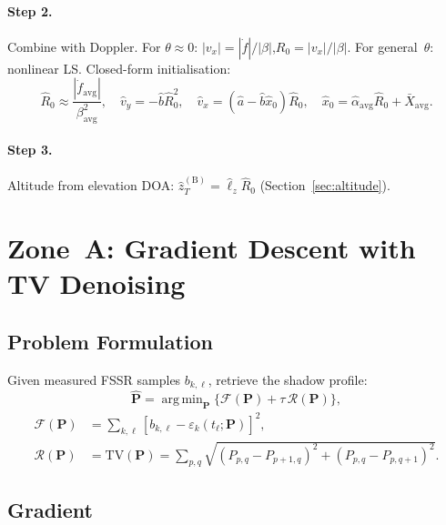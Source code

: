 \documentclass[11pt,a4paper]{article}
\newcommand{\TV}{\mathrm{TV}}
\DeclareMathOperator*{\argmin}{arg\,min}
\begin{document}
\paragraph{Step 2.}
Combine with Doppler.  For $\theta\approx 0$:
$|v_x|=|\dot{f}|/|\beta|$,\;$R_0=|v_x|/|\beta|$.
For general~$\theta$: nonlinear LS.  Closed-form initialisation:
\begin{equation}
  \hat{R}_0\approx
  \frac{|\dot{f}_{\mathrm{avg}}|}{\beta_{\mathrm{avg}}^2},
  \quad
  \hat{v}_y=-\hat{b}\hat{R}_0^2,
  \quad
  \hat{v}_x=(\hat{a}-\hat{b}\hat{x}_0)\hat{R}_0,
  \quad
  \hat{x}_0=\hat{\alpha}_{\mathrm{avg}}\hat{R}_0
  +\bar{X}_{\mathrm{avg}}.
  \label{eq:init_params}
\end{equation}

\paragraph{Step 3.}
Altitude from elevation DOA:
$\hat{z}_T^{(\mathrm{B})}=\hat{\ell}_z\hat{R}_0$\;
(Section~\ref{sec:altitude}).

\section{Zone~A: Gradient Descent with TV Denoising}
\label{sec:zone_a}

\subsection{Problem Formulation}

Given measured FSSR samples $b_{k,\ell}$, retrieve the shadow
profile:
\begin{equation}
  \hat{\mathbf{P}}=\argmin_{\mathbf{P}}\bigl\{
  \mathcal{F}(\mathbf{P})+\tau\,\mathcal{R}(\mathbf{P})\bigr\},
  \label{eq:opt}
\end{equation}
\begin{align}
  \mathcal{F}(\mathbf{P})
  &=\sum_{k,\ell}[b_{k,\ell}-\varepsilon_k(t_\ell;\mathbf{P})]^2,
  \label{eq:fidelity}\\
  \mathcal{R}(\mathbf{P})
  &=\TV(\mathbf{P})
  =\sum_{p,q}\sqrt{(P_{p,q}{-}P_{p+1,q})^2
  +(P_{p,q}{-}P_{p,q+1})^2}.
  \label{eq:tv}
\end{align}

\subsection{Gradient}
\end{document}
